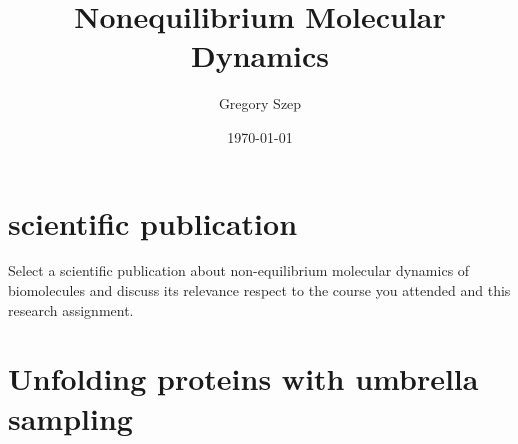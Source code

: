 \documentclass{article}[12pt]
\numberwithin{equation}{section}
\begin{document}
\title{
Nonequilibrium Molecular Dynamics
}

\author{Gregory Szep}
\date{\today}
\maketitle

\section{scientific publication}
Select a scientific publication about non-equilibrium molecular dynamics of
biomolecules and discuss its relevance respect to the course you attended and
this research assignment.
\pagebreak
\section{Unfolding proteins with umbrella sampling}
\end{document}
